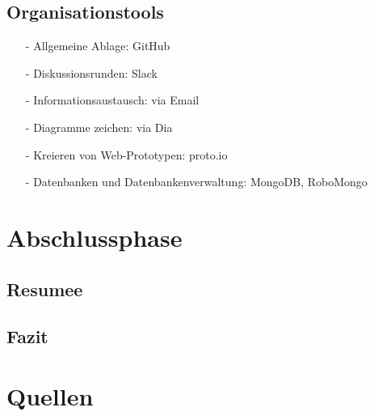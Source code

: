 \documentclass[12pt,a4paper]{article}
\begin{document}
\newpage
\subsection{Organisationstools}
\begin{itemize}
\item[-]Allgemeine Ablage: GitHub
\item[-]Diskussionsrunden: Slack
\item[-]Informationsaustausch: via Email
\item[-]Diagramme zeichen: via Dia 
\item[-]Kreieren von Web-Prototypen: proto.io
\item[-]Datenbanken und Datenbankenverwaltung: MongoDB, RoboMongo
\end{itemize}

\newpage
\section{Abschlussphase}
\subsection{Resumee}
\newpage
\subsection{Fazit}
\newpage
\section*{Quellen}
\end{document}
